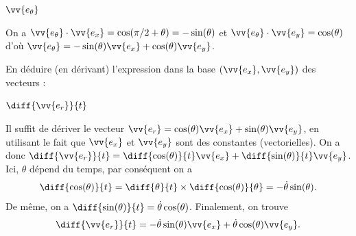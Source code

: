 \begin{enonce}
	$\vv{e_\theta}$
\end{enonce}


\begin{corrige}
On a  $\vv{e_\theta}\cdot\vv{e_x}=\cos(\pi/2+\theta)=-\sin(\theta)$ et  $\vv{e_\theta}\cdot\vv{e_y}=\cos(\theta)$ d'où $\vv{e_\theta}=- \sin(\theta) \vv{e_x} + \cos (\theta) \vv{e_y}$.
\end{corrige}



\pauseEntrainement

En déduire (en dérivant) l'expression dans la base $(\vv{e_x}, \vv{e_y})$ des vecteurs : 

\repriseEntrainement





\begin{enonce}
	$\diff{\vv{e_r}}{t}$
\end{enonce}


\begin{corrige}
 Il suffit de dériver le vecteur $\vv{e_r}=\cos(\theta) \vv{e_x} + \sin (\theta) \vv{e_y}$, en utilisant le fait que $\vv{e_x}$ et $\vv{e_y}$ sont des constantes (vectorielles). On a donc $\diff{\vv{e_r}}{t}=\diff{\cos(\theta)}{t} \vv{e_x} + \diff{\sin (\theta)}{t} \vv{e_y}$. 
 Ici, $\theta$ dépend du temps, par conséquent on a
 \[
 \diff{\cos(\theta)}{t}=\diff{\theta}{t}\times \diff{\cos(\theta)}{\theta}=-\dot{\theta}\sin(\theta).
 \] 
 De même, on a $\diff{\sin(\theta)}{t}=\dot{\theta}\cos(\theta)$.
 Finalement, on trouve
 \[
 \diff{\vv{e_r}}{t}=-\dot{\theta}\sin(\theta) \vv{e_x} + \dot{\theta}\cos (\theta) \vv{e_y}.
 \]
\end{corrige}


